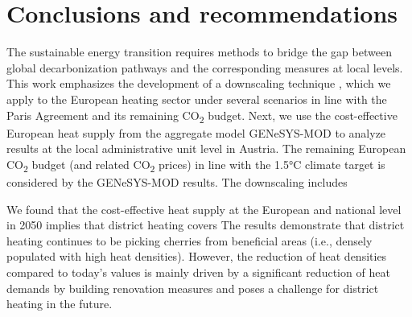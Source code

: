 \section{Conclusions and recommendations}\label{conclusions}
The sustainable energy transition requires methods to bridge the gap between global decarbonization pathways and the corresponding measures at local levels. This work emphasizes the development of a downscaling technique , which we apply to the European heating sector under several scenarios in line with the Paris Agreement and its remaining CO\textsubscript{2} budget. Next, we use the cost-effective European heat supply from the aggregate model GENeSYS-MOD to analyze results at the local administrative unit level in Austria.  The remaining European CO\textsubscript{2} budget (and related CO\textsubscript{2} prices) in line with the 1.5°C climate target is considered by the GENeSYS-MOD results. The downscaling includes \vspace{0.3cm}

We found that the cost-effective heat supply at the European and national level in 2050 implies that district heating covers  The results demonstrate that district heating continues to be picking cherries from beneficial areas (i.e., densely populated with high heat densities). However, the reduction of heat densities compared to today's values is mainly driven by a significant reduction of heat demands by building renovation measures and poses a challenge for district heating in the future. \vspace{0.3cm}

\vspace{0.3cm}

